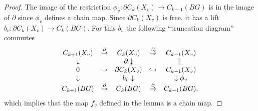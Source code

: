 \documentclass[11pt,letterpaper]{amsart}
\begin{document}
\begin{proof}
The image of the restriction $\phi_v:\partial C_k(X_v)\rightarrow C_{k-1}(BG)$ is in the image of $\partial$ since $\phi_v$ defines a chain map. Since $\partial C_k(X_v)$ is free, it has a lift $b_v:\partial C_k(X_v)\rightarrow C_{k}(BG)$. %
For this $b_v$ the following ``truncation diagram'' commutes
$$
\begin{array}{ccccc}
C_{k+1}(X_v)&\stackrel{\partial}\rightarrow &C_k(X_v)&\stackrel{\partial}\rightarrow &C_{k-1}(X_v)\\
\downarrow&&\partial\downarrow&&||\hspace{0.2cm}\\
0&\rightarrow&\partial C_k(X_v)&\hookrightarrow&C_{k-1}(X_v)\\
\downarrow&&b_v\downarrow&&\downarrow\phi_v\\
C_{k+1}(BG)&\stackrel{\partial}\rightarrow &C_k(BG)&\stackrel{\partial}\rightarrow& C_{k-1}(BG),
\end{array}
$$
which implies that the map $f_v$ defined in the lemma is a chain map. 
\end{proof}
\end{document}
